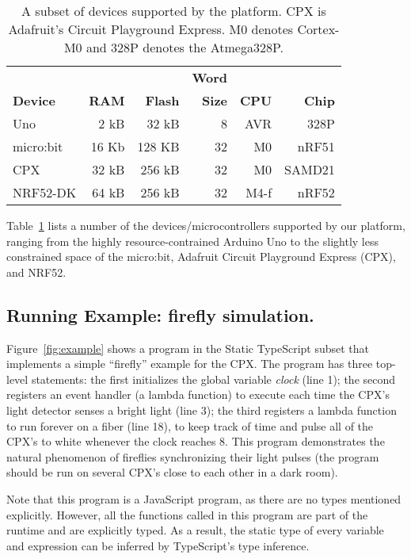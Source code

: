 \begin{table}[]
\centering
\begin{tabular}{|l|r|r|r|r|r|}
\hline
            &          &            & \bf{Word} &          &             \\
\bf{Device} & \bf{RAM} & \bf{Flash} & \bf{Size} & \bf{CPU} & \bf{Chip}   \\ \hline
Uno         & 2 kB     & 32 kB      & 8         & AVR      & 328P  \\ \hline
micro:bit   & 16 Kb    & 128 KB     & 32        & M0       & nRF51       \\ \hline
CPX         & 32 kB    & 256 kB     & 32        & M0       & SAMD21      \\ \hline
NRF52-DK    & 64 kB    & 256 kB     & 32        & M4-f     & nRF52     \\ \hline
\end{tabular}
\caption{\label{table:devices}A subset of devices supported by the platform.
CPX is Adafruit's Circuit Playground Express. M0 denotes Cortex-M0 and 328P denotes
the Atmega328P.}
\end{table}

Table~\ref{table:devices} lists a number of the devices/microcontrollers supported by our platform, 
ranging from the highly resource-contrained Arduino Uno to the slightly less constrained space of
the micro:bit, Adafruit Circuit Playground Express (CPX), and NRF52.

\subsection{Running Example: firefly simulation.}

Figure~\ref{fig:example} shows a program in the Static
TypeScript subset that implements a simple ``firefly'' example
for the CPX.
The program has three top-level statements:
the first initializes the global variable \emph{clock} (line 1); the
second registers an event handler (a lambda function) to execute
each time the CPX's light detector senses a bright light (line 3); the
third registers a lambda function to run forever on a fiber (line 18),
to keep track of time and pulse all of the CPX's to white whenever the
clock reaches 8.  This program demonstrates the natural phenomenon
of fireflies synchronizing their light pulses (the program should be
run on several CPX's close to each other in a dark room).

Note that this program is a JavaScript program, as there are no
types mentioned explicitly. However, all the functions called in
this program are part of the runtime and are explicitly
typed.  As a result, the static type of every variable and expression
can be inferred by TypeScript's type inference.

